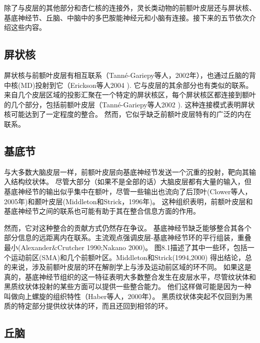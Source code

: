 除了与皮层的其他部分和杏仁核的连接外，灵长类动物的前额叶皮层还与屏状核、基底神经节、丘脑、中脑中的多巴胺能神经元和小脑有连接。接下来的五节依次介绍这些内容。



\subsection{屏状核}
\par

屏状核与前额叶皮层有相互联系（Tanné-Gariepy等人，2002年），也通过丘脑的背中核(MD)投射到它（Erickson等人2004 ). 它与皮层的其余部分也有类似的联系。来自几个皮层区域的投影汇聚在一个特定的屏状核区，每个屏状核区都连接到额叶的几个部分，包括前额叶皮层（Tanné-Gariepy等人2002 ). 这种连接模式表明屏状核可能达到了一定程度的整合。
然而，它似乎缺乏前额叶皮层特有的广泛的内在联系。



\subsection{基底节}
\par

与大多数大脑皮层一样，前额叶皮层向基底神经节发送一个沉重的投射，靶向其输入结构纹状体。
尽管大部分（如果不是全部的话）大脑皮层都有大量的输入，但基底神经节的输出似乎集中在额叶，尽管一些输出也流向了后顶叶(Clower等人，2005年)和颞叶皮层(Middleton和Strick，1996年)。
这种组织表明，前额叶皮层和基底神经节之间的联系也可能有助于其在整合信息方面的作用。
\par

然而，它对这种整合的贡献方式仍然存在争议。
基底神经节缺乏能够整合其各个部分信息的远距离内在联系。主流观点强调皮层-基底神经节环的平行组装，重叠最小(Alexander$\&$Crutcher 1990;Nakano 2000)。
图8.1描述了其中一些环，包括一个运动前区(SMA)和几个前额叶区。Middleton和Strick(1994,2000) 得出结论，总的来说，涉及前额叶皮层的环在解剖学上与涉及运动前区域的环不同。
如果这是真的，基底神经节组织的这一特征表明大多数整合发生在皮层水平，尽管纹状体和黑质纹状体投射的某些方面可以提供一些整合能力。
他们这样做可能是因为一种叫做向上螺旋的组织特性（Haber等人，2000年）。
黑质纹状体突起不仅回到为黑质的特定部分提供纹状体的环，而且还回到相邻的环。



\subsection{丘脑}
\par

